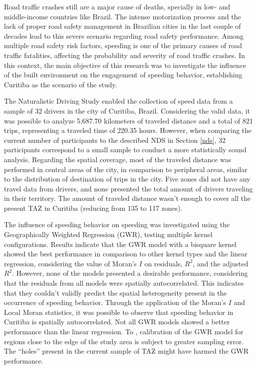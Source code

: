 Road traffic crashes still are a major cause of deaths, specially in low- and middle-income countries like Brazil. The intense motorization process and the lack of proper road safety management in Brazilian cities in the last couple of decades lead to this severe scenario regarding road safety performance. Among multiple road safety risk factors, speeding is one of the primary causes of road traffic fatalities, affecting the probability and severity of road traffic crashes. In this context, the main objective of this research was to investigate the influence of the built environment on the engagement of speeding behavior, establishing Curitiba as the scenario of the study. 

The Naturalistic Driving Study enabled the collection of speed data from a sample of 32 drivers in the city of Curitiba, Brazil. Considering the valid data, it was possible to analyze 5,687.70 kilometers of traveled distance and a total of 821 trips, representing a traveled time of 220.35 hours. However, when comparing the current number of participants to the described NDS in Section \ref{nds}, 32 participants correspond to a small sample to conduct a more statistically sound analysis. Regarding the spatial coverage, most of the traveled distance was performed in central areas of the city, in comparison to peripheral areas, similar to the distribution of destination of trips in the city. Five zones did not have any travel data from drivers, and none presented the total amount of drivers traveling in their territory. The amount of traveled distance wasn't enough to cover all the present TAZ in Curitiba (reducing from 135 to 117 zones). 

The influence of speeding behavior on speeding was investigated using the Geographically Weighted Regression (GWR), testing multiple kernel configurations. Results indicate that the GWR model with a bisquare kernel showed the best performance in comparison to other kernel types and the linear regression, considering the value of Moran's $I$ on residuals, $R^2$, and the adjusted $R^2$. However, none of the models presented a desirable performance, considering that the residuals from all models were spatially autocorrelated. This indicates that they couldn't validly predict the spatial heterogeneity present in the occurrence of speeding behavior. Through the application of the Moran's $I$ and Local Moran statistics, it was possible to observe that speeding behavior in Curitiba is spatially autocorrelated. Not all GWR models showed a better performance than the linear regression. To \textcite{Brunsdon2010}, calibration of the GWR model for regions close to the edge of the study area is subject to greater sampling error. The ``holes'' present in the current sample of TAZ might have harmed the GWR performance. 

